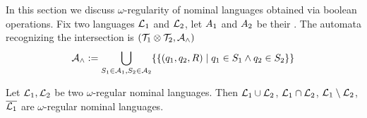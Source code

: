 \newcommand{\compl}[1]{\overline{#1}}
 
In this section we discuss $\omega$-regularity of nominal languages obtained via boolean operations. Fix two languages $\mathcal{L}_1$ and $\mathcal{L}_2$, let $A_1$ and $A_2$ be their \hdmas. The automata recognizing the intersection is $(\mathcal{T}_1 \otimes \mathcal{T}_2, \mathcal{A}_{\land})$
%
\begin{align*}
	\mathcal{A}_{\land} &:= \bigcup_{S_1 \in \mathcal{A}_1,S_2 \in \mathcal{A}_2 } \{\{ (q_1,q_2,R) \mid q_1 \in S_1 \land q_2 \in S_2 \}\} \\
\end{align*}


\begin{theorem}
Let $\mathcal{L}_1,\mathcal{L}_2$ be two $\omega$-regular nominal languages. Then $\mathcal{L}_1 \cup \mathcal{L}_2$, $\mathcal{L}_1 \cap \mathcal{L}_2$, $\mathcal{L}_1 \setminus \mathcal{L}_2$, $\compl{\Lang_1}$ are $\omega$-regular nominal languages.
\end{theorem}

